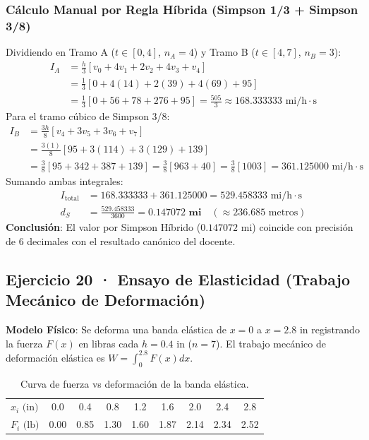 \documentclass[11pt,a4paper]{article}
\begin{document}
\subsubsection{Cálculo Manual por Regla Híbrida (Simpson 1/3 + Simpson 3/8)}
Dividiendo en Tramo A ($t \in [0, 4]$, $n_A = 4$) y Tramo B ($t \in [4, 7]$, $n_B = 3$):
\begin{align*}
I_A &= \frac{h}{3} \left[ v_0 + 4v_1 + 2v_2 + 4v_3 + v_4 \right] \\
    &= \frac{1}{3} \left[ 0 + 4(14) + 2(39) + 4(69) + 95 \right] \\
    &= \frac{1}{3} \left[ 0 + 56 + 78 + 276 + 95 \right] = \frac{505}{3} \approx 168.333333 \text{ mi/h}\cdot\text{s}
\end{align*}
Para el tramo cúbico de Simpson 3/8:
\begin{align*}
I_B &= \frac{3h}{8} \left[ v_4 + 3v_5 + 3v_6 + v_7 \right] \\
    &= \frac{3(1)}{8} \left[ 95 + 3(114) + 3(129) + 139 \right] \\
    &= \frac{3}{8} \left[ 95 + 342 + 387 + 139 \right] = \frac{3}{8} [963 + 40] = \frac{3}{8} [1003] = 361.125000 \text{ mi/h}\cdot\text{s}
\end{align*}
Sumando ambas integrales:
\begin{align*}
I_{\text{total}} &= 168.333333 + 361.125000 = 529.458333 \text{ mi/h}\cdot\text{s} \\
d_S &= \frac{529.458333}{3600} = \mathbf{0.147072 \text{ mi}} \quad (\approx 236.685 \text{ metros})
\end{align*}
\textbf{Conclusión}: El valor por Simpson Híbrido ($0.147072\text{ mi}$) coincide con precisión de $6$ decimales con el resultado canónico del docente.

\subsection{Ejercicio 20 · Ensayo de Elasticidad (Trabajo Mecánico de Deformación)}

\textbf{Modelo Físico}: Se deforma una banda elástica de $x = 0$ a $x = 2.8\text{ in}$ registrando la fuerza $F(x)$ en libras cada $h = 0.4\text{ in}$ ($n=7$). El trabajo mecánico de deformación elástica es $W = \int_0^{2.8} F(x) dx$.

\begin{table}[h!]
\centering
\caption{Curva de fuerza vs deformación de la banda elástica.}
\begin{tabular}{lcccccccc}
\toprule
$x_i \text{ (in)}$ & 0.0 & 0.4 & 0.8 & 1.2 & 1.6 & 2.0 & 2.4 & 2.8 \\
$F_i \text{ (lb)}$ & 0.00 & 0.85 & 1.30 & 1.60 & 1.87 & 2.14 & 2.34 & 2.52 \\
\bottomrule
\end{tabular}
\end{table}
\end{document}
